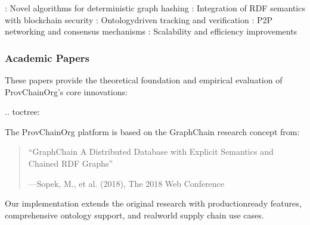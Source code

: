 \documentclass[letterpaper,10pt,english]{sphinxmanual}
\begin{document}
\sphinxAtStartPar
{}
\sphinxhyphen{} : Novel algorithms for deterministic graph hashing
\sphinxhyphen{} : Integration of RDF semantics with blockchain security
\sphinxhyphen{} : Ontology\sphinxhyphen{}driven tracking and verification
\sphinxhyphen{} : P2P networking and consensus mechanisms
\sphinxhyphen{} : Scalability and efficiency improvements


\subsubsection{Academic Papers}
\label{\detokenize{research/index:academic-papers}}
\sphinxAtStartPar
These papers provide the theoretical foundation and empirical evaluation of ProvChainOrg’s core innovations:

\sphinxAtStartPar
{}
.. toctree:

\begin{sphinxVerbatim}[commandchars=\\\{\}]
 
  

\end{sphinxVerbatim}

\sphinxAtStartPar
{}
The ProvChainOrg platform is based on the GraphChain research concept from:
\begin{quote}

\sphinxAtStartPar
“GraphChain \textendash{} A Distributed Database with Explicit Semantics and Chained RDF Graphs”

\begin{flushright}
---Sopek, M., et al. (2018), The 2018 Web Conference
\end{flushright}
\end{quote}

\sphinxAtStartPar
Our implementation extends the original research with production\sphinxhyphen{}ready features, comprehensive ontology support, and real\sphinxhyphen{}world supply chain use cases.
\end{document}
